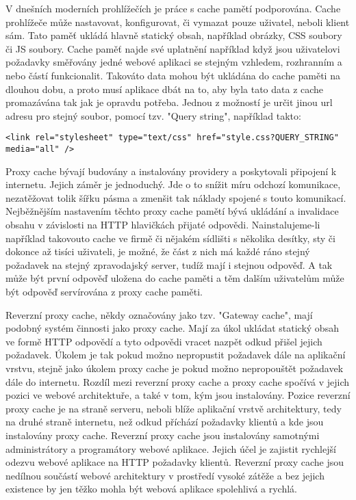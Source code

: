 \documentclass[12pt]{article}
\begin{document}
V dnešních moderních prohlížečích je práce s cache pamětí podporována. Cache prohlížeče může nastavovat, konfigurovat, či vymazat pouze uživatel, neboli klient sám. Tato paměť ukládá hlavně statický obsah, například obrázky, CSS soubory či JS soubory. Cache paměť najde své uplatnění například když jsou uživatelovi požadavky směřovány jedné webové aplikaci se stejným vzhledem, rozhranním a nebo částí funkcionalit. Takováto data mohou být ukládána do cache paměti na dlouhou dobu, a proto musí aplikace dbát na to, aby byla tato data z cache promazávána tak jak je opravdu potřeba. Jednou z možností je určit jinou url adresu pro stejný soubor, pomocí tzv. "Query string", například takto:

\begin{scriptsize}
\begin{verbatim}
<link rel="stylesheet" type="text/css" href="style.css?QUERY_STRING" media="all" />
\end{verbatim}
\end{scriptsize}

Proxy cache bývají budovány a instalovány providery a poskytovali připojení k internetu. Jejich záměr je jednoduchý. Jde o to snížit míru odchozí komunikace, nezatěžovat tolik šířku pásma a zmenšit tak náklady spojené s touto komunikací. Nejběžnějším nastavením těchto proxy cache pamětí bývá ukládání a invalidace obsahu v závislosti na HTTP hlavičkách přijaté odpovědi. Nainstalujeme-li například takovouto cache ve firmě či nějakém sídlišti s několika desítky, sty či dokonce až tisíci uživateli, je možné, že část z nich má každé ráno stejný požadavek na stejný zpravodajský server, tudíž mají i stejnou odpověď. A tak může být první odpověď uložena do cache paměti a těm dalším uživatelům může být odpověď servírována z proxy cache paměti.\cite{proxy-cache}

Reverzní proxy cache, někdy označovány jako tzv. "Gateway cache", mají podobný systém činnosti jako proxy cache. Mají za úkol ukládat statický obsah ve formě HTTP odpovědí a tyto odpovědi vracet nazpět odkud přišel jejich požadavek. Úkolem je tak pokud možno nepropustit požadavek dále na aplikační vrstvu, stejně jako úkolem proxy cache je pokud možno nepropouštět požadavek dále do internetu. Rozdíl mezi reverzní proxy cache a proxy cache spočívá v jejich pozici ve webové architektuře, a také v tom, kým jsou instalovány. Pozice reverzní proxy cache je na straně serveru, neboli blíže aplikační vrstvě architektury, tedy na druhé straně internetu, než odkud příchází požadavky klientů a kde jsou instalovány proxy cache. Reverzní proxy cache jsou instalovány samotnými administrátory a programátory webové aplikace. Jejich účel je zajistit rychlejší odezvu webové aplikace na HTTP požadavky klientů. Reverzní proxy cache jsou nedílnou součástí webové architektury v prostředí vysoké zátěže a bez jejich existence by jen těžko mohla být webová aplikace spolehlivá a rychlá.\cite{proxy-cache}
\end{document}
